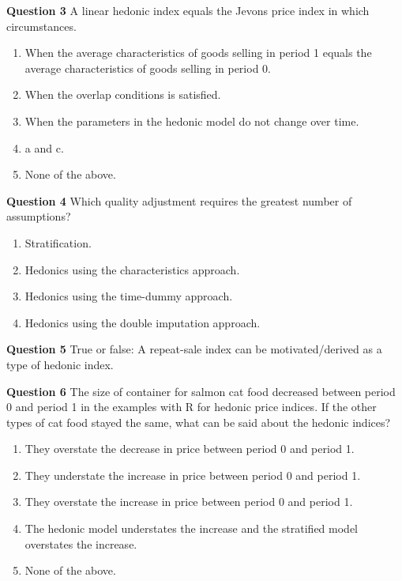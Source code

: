\documentclass[]{article}
\begin{document}
\textbf{Question 3} A linear hedonic index equals the Jevons price index in which circumstances.

\begin{enumerate}
\def\labelenumi{\alph{enumi})}
\item
  When the average characteristics of goods selling in period 1 equals the average characteristics of goods selling in period 0.
\item
  When the overlap conditions is satisfied.
\item
  When the parameters in the hedonic model do not change over time.
\item
  a and c.
\item
  None of the above.
\end{enumerate}

\textbf{Question 4} Which quality adjustment requires the greatest number of assumptions?

\begin{enumerate}
\def\labelenumi{\alph{enumi})}
\item
  Stratification.
\item
  Hedonics using the characteristics approach.
\item
  Hedonics using the time-dummy approach.
\item
  Hedonics using the double imputation approach.
\end{enumerate}

\textbf{Question 5} True or false: A repeat-sale index can be motivated/derived as a type of hedonic index.

\textbf{Question 6} The size of container for salmon cat food decreased between period 0 and period 1 in the examples with R for hedonic price indices. If the other types of cat food stayed the same, what can be said about the hedonic indices?

\begin{enumerate}
\def\labelenumi{\alph{enumi})}
\item
  They overstate the decrease in price between period 0 and period 1.
\item
  They understate the increase in price between period 0 and period 1.
\item
  They overstate the increase in price between period 0 and period 1.
\item
  The hedonic model understates the increase and the stratified model overstates the increase.
\item
  None of the above.
\end{enumerate}
\end{document}
